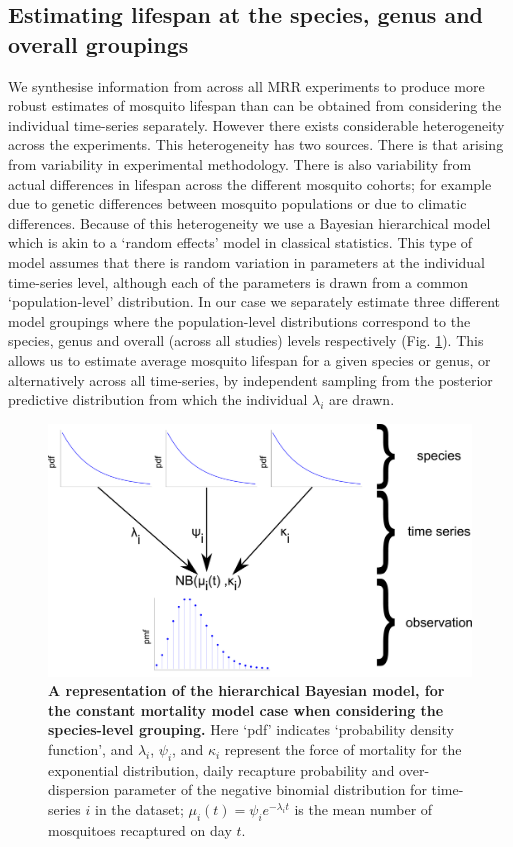 \documentclass[12pt]{article}
\begin{document}
\subsection{Estimating lifespan at the species, genus and overall groupings}\label{sec:MRR_hierarchical}
We synthesise information from across all MRR experiments to produce more robust estimates of mosquito lifespan than can be obtained from considering the individual time-series separately. However there exists considerable heterogeneity across the experiments. This heterogeneity has two sources. There is that arising from variability in experimental methodology. There is also variability from actual differences in lifespan across the different mosquito cohorts; for example due to genetic differences between mosquito populations or due to climatic differences. Because of this heterogeneity we use a Bayesian hierarchical model which is akin to a `random effects' model in classical statistics. This type of model assumes that there is random variation in parameters at the individual time-series level, although each of the parameters is drawn from a common `population-level' distribution. In our case we separately estimate three different model groupings where the population-level distributions correspond to the species, genus and overall (across all studies) levels respectively (Fig. \ref{fig:mrr_methodDiagramHierarchy}). This allows us to estimate average mosquito lifespan for a given species or genus, or alternatively across all time-series, by independent sampling from the posterior predictive distribution from which the individual $\lambda_i$ are drawn.


\begin{figure}[h]
	\centerline{\includegraphics[width=1\textwidth]{./Figure_files/mrr_methodDiagramHierarchy.pdf}}
	\caption{\textbf{A representation of the hierarchical Bayesian model, for the constant mortality model case when considering the species-level grouping.} Here `pdf' indicates `probability density function', and $\lambda_i$, $\psi_i$, and $\kappa_i$ represent the force of mortality for the exponential distribution, daily recapture probability and over-dispersion parameter of the negative binomial distribution for time-series $i$ in the dataset; $\mu_i(t)= \psi_i e^{-\lambda_i t}$ is the mean number of mosquitoes recaptured on day $t$.}
	\label{fig:mrr_methodDiagramHierarchy}
\end{figure}
\end{document}
